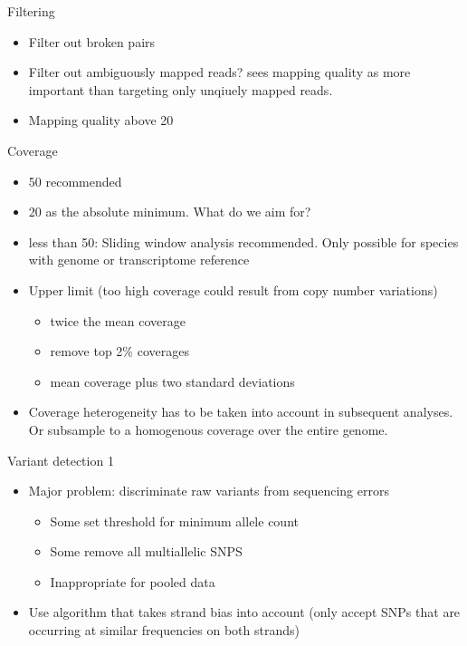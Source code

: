 \documentclass[presentation]{beamer}
\begin{document}
\begin{frame}[label=sec-22]{Filtering}
\begin{itemize}
\item Filter out broken pairs
\item Filter out ambiguously mapped reads? \citep{Schlotterer2014} sees
mapping quality as more important than targeting only unqiuely
mapped reads.
\item Mapping quality above 20
\end{itemize}
\end{frame}

\begin{frame}[label=sec-23]{Coverage}
\begin{itemize}
\item 50 recommended
\item 20 as the absolute minimum. What do we aim for?
\item less than 50: Sliding window analysis recommended. Only possible for species
with genome or transcriptome reference
\item Upper limit (too high coverage could result from copy number variations)
\begin{itemize}
\item twice the mean coverage
\item remove top 2\% coverages
\item mean coverage plus two standard deviations
\end{itemize}
\item Coverage heterogeneity has to be taken into account in subsequent
analyses. Or subsample to a homogenous coverage over the entire
genome.
\end{itemize}
\end{frame}
\begin{frame}[label=sec-24]{Variant detection 1}
\begin{itemize}
\item \alert{Major problem}: discriminate raw variants from sequencing errors
\begin{itemize}
\item Some set threshold for minimum allele count
\item Some remove all multiallelic SNPS \citep{Beissinger2014}
\item Inappropriate for pooled data \citep{Raineri2012}
\end{itemize}
\item Use algorithm that takes strand bias into account (only accept SNPs
that are occurring at similar frequencies on both strands)
\end{itemize}
\end{frame}
\end{document}
